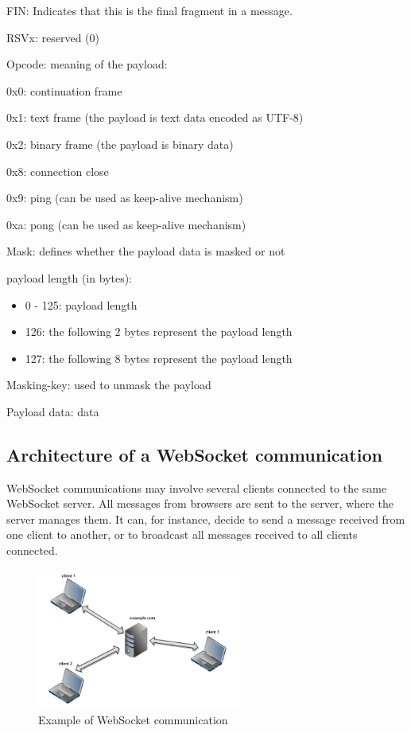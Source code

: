 \documentclass[pdftex,10pt,a4paper]{report}
\newenvironment{packed_item}{
\begin{itemize}
  \setlength{\itemsep}{1pt}
  \setlength{\parskip}{0pt}
  \setlength{\parsep}{0pt}
}{\end{itemize}}
\begin{document}
\begin{packed_item}
	\item FIN: Indicates that this is the final fragment in a message.
	\item RSVx: reserved (0)
	\item Opcode: meaning of the payload:
		\begin{packed_item}
			\item 0x0: continuation frame
			\item 0x1: text frame (the payload is text data encoded as UTF-8)
			\item 0x2: binary frame (the payload is binary data)
			\item 0x8: connection close
			\item 0x9: ping (can be used as keep-alive mechanism)
			\item 0xa: pong (can be used as keep-alive mechanism)
		\end{packed_item}
	\item Mask: defines whether the payload data is masked or not
	\item payload length (in bytes):
		\begin{itemize}
			\item 0 - 125: payload length
			\item 126: the following 2 bytes represent the payload length
			\item 127: the following 8 bytes represent the payload length
		\end{itemize}
	\item Masking-key: used to unmask the payload
	\item Payload data: data
\end{packed_item}


\subsection{Architecture of a WebSocket communication}
WebSocket communications may involve several clients connected to the same WebSocket server. All messages from browsers are sent to the server, where the server manages them. It can, for instance, decide to send a message received from one client to another, or to broadcast all messages received to all clients connected.


\begin{figure}[h!]
		\centering
		\includegraphics[width=0.6\textwidth]{./ws.jpg}
		\caption{Example of WebSocket communication}
		\label{Example of WebSocket communication}
\end{figure}
\end{document}
